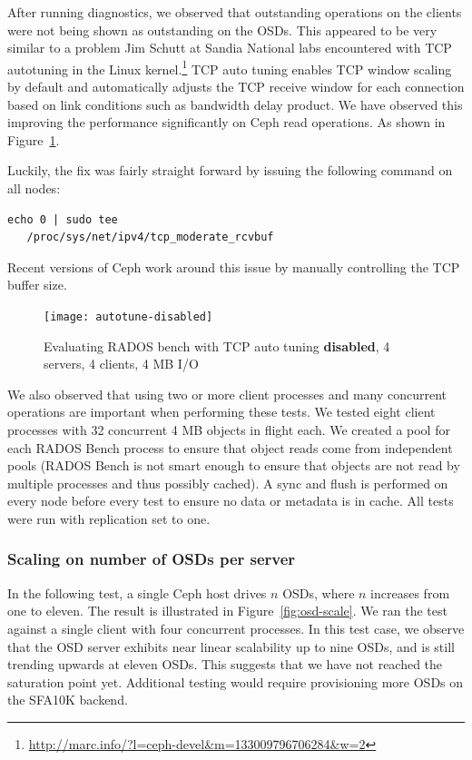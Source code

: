 After running diagnostics, we observed that outstanding operations on the
clients were not being shown as outstanding on the OSDs.  This appeared to be
very similar to a problem Jim Schutt at Sandia National labs encountered with
TCP autotuning in the Linux
kernel.\footnote{\url{http://marc.info/?l=ceph-devel&m=133009796706284&w=2}}
TCP auto tuning enables TCP window scaling by default and automatically adjusts
the TCP receive window for each connection based on link conditions such as
bandwidth delay product. We have observed this improving the performance
significantly on Ceph read operations. As shown in
Figure~\ref{fig:rados-tcp-autotune-disabled}.



Luckily, the fix was fairly straight forward by issuing the following command
on all nodes:

\begin{Verbatim}[fontsize=\small]
 echo 0 | sudo tee 
   /proc/sys/net/ipv4/tcp_moderate_rcvbuf
\end{Verbatim}

Recent versions of Ceph work around this issue by manually controlling the TCP
buffer size.  

\begin{figure}[htb]
\centering
\texttt{[image: autotune-disabled]}
\caption{Evaluating RADOS bench with TCP auto tuning \textbf{disabled},  4 servers, 4
clients, 4 MB I/O}
\label{fig:rados-tcp-autotune-disabled}
\end{figure}




We also observed that using two or more client processes and many concurrent
operations are important when performing these tests.  We tested eight client
processes with 32 concurrent 4 MB objects in flight each. We created a pool
for each RADOS Bench process to ensure that object reads come from independent
pools (RADOS Bench is not smart enough to ensure that objects are not read by
multiple processes and thus possibly cached).  A sync and flush is performed
on every node before every test to ensure no data or metadata is in cache.
All tests were run with replication set to one.  

\subsubsection{Scaling on number of OSDs per server}

In the following test, a single Ceph host drives $n$ OSDs, where $n$ increases
from one to eleven. The result is illustrated in Figure~\ref{fig:osd-scale}.
We ran the test against a single client with four concurrent processes. In this
test case, we observe that the OSD server exhibits near linear scalability up to
nine OSDs, and is still trending upwards at eleven OSDs. This suggests that we
have not reached the saturation point yet. Additional testing would require
provisioning more OSDs on the SFA10K backend.


